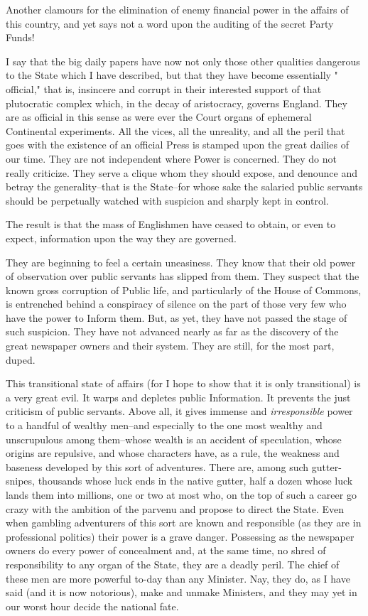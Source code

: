 \documentclass{book}
\begin{document}
Another clamours for the elimination of enemy financial power in the affairs of this country, and yet says not a word upon the auditing of the secret Party Funds!

I say that the big daily papers have now not only those other qualities dangerous to the State which I have described, but that they have become essentially " official," that is, insincere and corrupt in their interested support of that plutocratic complex which, in the decay of aristocracy, governs England. They are as official in this sense as were ever the Court organs of ephemeral Continental experiments. All the vices, all the unreality, and all the peril that goes with the existence of an official Press is stamped upon the great dailies of our time. They are not independent where Power is concerned. They do not really criticize. They serve a clique whom they should expose, and denounce and betray the generality–that is the State–for whose sake the salaried public servants should be perpetually watched with suspicion and sharply kept in control.

The result is that the mass of Englishmen have ceased to obtain, or even to expect, information upon the way they are governed.

They are beginning to feel a certain uneasiness. They know that their old power of observation over public servants has slipped from them. They suspect that the known gross corruption of Public life, and particularly of the House of Commons, is entrenched behind a conspiracy of silence on the part of those very few who have the power to Inform them. But, as yet, they have not passed the stage of such suspicion. They have not advanced nearly as far as the discovery of the great newspaper owners and their system. They are still, for the most part, duped.

This transitional state of affairs (for I hope to show that it is only transitional) is a very great evil. It warps and depletes public Information. It prevents the just criticism of public servants. Above all, it gives immense and \emph{irresponsible} power to a handful of wealthy men–and especially to the one most wealthy and unscrupulous among them–whose wealth is an accident of speculation, whose origins are repulsive, and whose characters have, as a rule, the weakness and baseness developed by this sort of adventures. There are, among such gutter-snipes, thousands whose luck ends in the native gutter, half a dozen whose luck lands them into millions, one or two at most who, on the top of such a career go crazy with the ambition of the parvenu and propose to direct the State. Even when gambling adventurers of this sort are known and responsible (as they are in professional politics) their power is a grave danger. Possessing as the newspaper owners do every power of concealment and, at the same time, no shred of responsibility to any organ of the State, they are a deadly peril. The chief of these men are more powerful to-day than any Minister. Nay, they do, as I have said (and it is now notorious), make and unmake Ministers, and they may yet in our worst hour decide the national fate.
\end{document}

